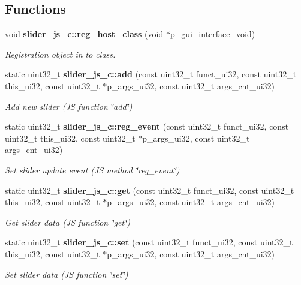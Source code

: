\subsection*{Functions}
\begin{DoxyCompactItemize}
\item 
void \textbf{ slider\+\_\+js\+\_\+c\+::reg\+\_\+host\+\_\+class} (void $\ast$p\+\_\+gui\+\_\+interface\+\_\+void)
\begin{DoxyCompactList}\small\item\em Registration object in to class. \end{DoxyCompactList}\item 
static uint32\+\_\+t \textbf{ slider\+\_\+js\+\_\+c\+::add} (const uint32\+\_\+t funct\+\_\+ui32, const uint32\+\_\+t this\+\_\+ui32, const uint32\+\_\+t $\ast$p\+\_\+args\+\_\+ui32, const uint32\+\_\+t args\+\_\+cnt\+\_\+ui32)
\begin{DoxyCompactList}\small\item\em Add new slider (JS function \char`\"{}add\char`\"{}) \end{DoxyCompactList}\item 
static uint32\+\_\+t \textbf{ slider\+\_\+js\+\_\+c\+::reg\+\_\+event} (const uint32\+\_\+t funct\+\_\+ui32, const uint32\+\_\+t this\+\_\+ui32, const uint32\+\_\+t $\ast$p\+\_\+args\+\_\+ui32, const uint32\+\_\+t args\+\_\+cnt\+\_\+ui32)
\begin{DoxyCompactList}\small\item\em Set slider update event (JS method \char`\"{}reg\+\_\+event\char`\"{}) \end{DoxyCompactList}\item 
static uint32\+\_\+t \textbf{ slider\+\_\+js\+\_\+c\+::get} (const uint32\+\_\+t funct\+\_\+ui32, const uint32\+\_\+t this\+\_\+ui32, const uint32\+\_\+t $\ast$p\+\_\+args\+\_\+ui32, const uint32\+\_\+t args\+\_\+cnt\+\_\+ui32)
\begin{DoxyCompactList}\small\item\em Get slider data (JS function \char`\"{}get\char`\"{}) \end{DoxyCompactList}\item 
static uint32\+\_\+t \textbf{ slider\+\_\+js\+\_\+c\+::set} (const uint32\+\_\+t funct\+\_\+ui32, const uint32\+\_\+t this\+\_\+ui32, const uint32\+\_\+t $\ast$p\+\_\+args\+\_\+ui32, const uint32\+\_\+t args\+\_\+cnt\+\_\+ui32)
\begin{DoxyCompactList}\small\item\em Set slider data (JS function \char`\"{}set\char`\"{}) \end{DoxyCompactList}\item 

\end{DoxyCompactItemize}
